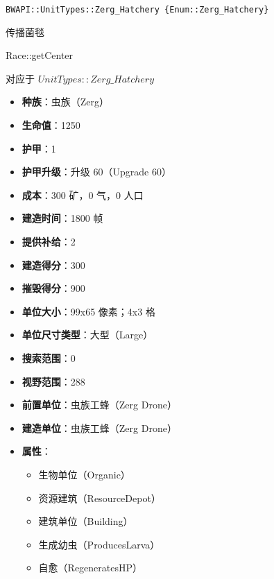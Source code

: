 \begin{tcolorbox}[colback=white, colframe=black!60!white, title=Zerg\_Hatchery(), arc=0mm]
    \begin{verbatim}
BWAPI::UnitTypes::Zerg_Hatchery {Enum::Zerg_Hatchery}
    \end{verbatim}
    传播菌毯
    \begin{refer}
    Race::getCenter 
    \end{refer}    
    对应于  $UnitTypes::Zerg\_Hatchery$ 
    \begin{itemize}
        \item \textbf{种族}：虫族（Zerg）
        \item \textbf{生命值}：1250
        \item \textbf{护甲}：1
        \item \textbf{护甲升级}：升级 60（Upgrade 60）
        \item \textbf{成本}：300 矿，0 气，0 人口
        \item \textbf{建造时间}：1800 帧
        \item \textbf{提供补给}：2
        \item \textbf{建造得分}：300
        \item \textbf{摧毁得分}：900
        \item \textbf{单位大小}：99x65 像素；4x3 格
        \item \textbf{单位尺寸类型}：大型（Large）
        \item \textbf{搜索范围}：0
        \item \textbf{视野范围}：288
        \item \textbf{前置单位}：虫族工蜂（Zerg Drone）
        \item \textbf{建造单位}：虫族工蜂（Zerg Drone）
        \item \textbf{属性}：
            \begin{itemize}
                \item 生物单位（Organic）
                \item 资源建筑（ResourceDepot）
                \item 建筑单位（Building）
                \item 生成幼虫（ProducesLarva）
                \item 自愈（RegeneratesHP）
            \end{itemize}
    \end{itemize}
\end{tcolorbox}

